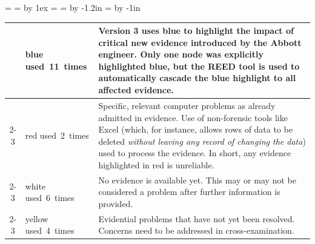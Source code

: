 =\hbox{}%
 =  \advance {} by 1ex  = 
\newdimen \colwid \colwid = \textwidth \advance \colwid by -1.2in
\newdimen \headwid \headwid = \textwidth \advance \headwid by -1in
\begin{tabular}{@{}cp{1.45cm}p{\colwid}}
\vphantom{\copy0}{blue}&\hbox{blue} \hbox{used 11 times}&Version 3 uses blue to highlight the impact of critical new evidence introduced by the Abbott engineer. Only one node was explicitly highlighted blue, but the REED tool is used to automatically cascade the blue highlight to all affected evidence.\\
\cline{2-3}
{red}&\hbox{red} \hbox{used 2 times}&Specific, relevant computer problems as already admitted in evidence. Use of non-forensic tools like Excel (which, for instance, allows rows of data to be deleted \emph{without leaving any record of changing the data\/}) used to process the evidence. In short, any evidence highlighted in red is unreliable.\\
\cline{2-3}
{white}&\hbox{white} \hbox{used 6 times}&No evidence is available yet. This may or may not be considered a problem after further information is provided.\\
\cline{2-3}
{yellow}&\hbox{yellow} \hbox{used 4 times}&Evidential problems that have not yet been resolved. Concerns need to be addressed in cross-examination.\\
 \end{tabular}

